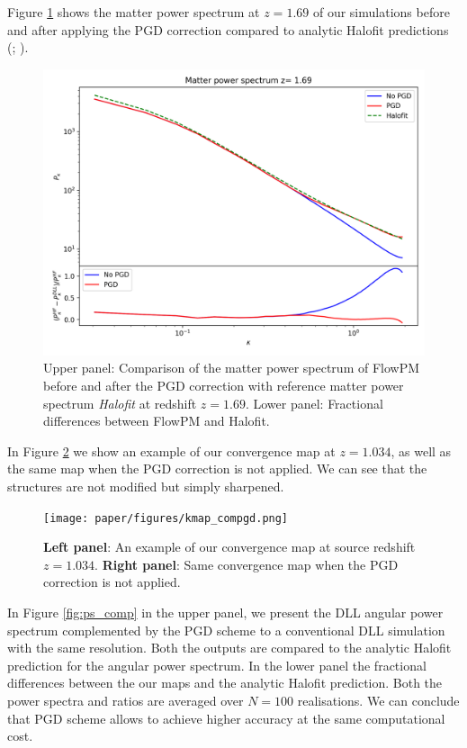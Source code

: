 \documentclass[twocolumn,twocolappendix]{aastex63}
\begin{document}
Figure \ref{fig:pkhalofit_comp} shows the matter power spectrum at $z=1.69$ of our simulations before and after applying the PGD correction compared to analytic Halofit predictions (\cite{smith2003stable}; \cite{takahashi2012revising}).
\begin{figure}
    \centering
    \includegraphics[width=\columnwidth]{paper/figures/pkhalofit_comp.png}
    \caption{
    Upper panel: Comparison of the matter power spectrum of FlowPM before and after the PGD correction with reference matter power spectrum \textit{Halofit} at redshift $z = 1.69$. Lower panel: Fractional differences between FlowPM and Halofit.
    }
    \label{fig:pkhalofit_comp}
\end{figure}

In Figure \ref{fig:comp_kmap} we show an example of our convergence map at $ z= 1.034$, as well as the same map when the PGD correction is not applied. 
We can see that the structures are not modified but simply sharpened.
\begin{figure}
    \centering
    \texttt{[image: paper/figures/kmap\_compgd.png]}
    \caption{ \textbf{Left panel}: An example of our convergence map at source redshift $z= 1.034$.
    \textbf{Right panel}: Same convergence map when the PGD correction is not applied.}
    \label{fig:comp_kmap}
\end{figure}

In Figure \ref{fig:ps_comp} in the upper panel, we present the DLL angular power spectrum complemented by the PGD scheme to a conventional DLL simulation with the same resolution. Both the outputs are compared to the analytic Halofit prediction for the angular power spectrum. In the lower panel the fractional differences between the our maps and the analytic Halofit prediction.  Both the power spectra and ratios are averaged over $N = 100$ realisations.
We can conclude that PGD scheme allows to achieve higher accuracy at the same computational cost.
 
\end{document}
